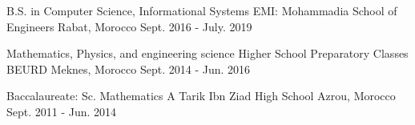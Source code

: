 

\begin{cventries}

  \cvedu
    {B.S. in Computer Science, Informational Systems} %
    {EMI: Mohammadia School of Engineers} %
    {Rabat, Morocco} %
    {Sept. 2016 - July. 2019} %
    {}

  \cvedu
    {Mathematics, Physics, and engineering science} %
    {Higher School Preparatory Classes} %
    {BEURD Meknes, Morocco} %
    {Sept. 2014 - Jun. 2016} %
    {}

  \cvedu
    {Baccalaureate: Sc. Mathematics A} %
    {Tarik Ibn Ziad High School} %
    {Azrou, Morocco} %
    {Sept. 2011 - Jun. 2014} %
    {}

\end{cventries}
